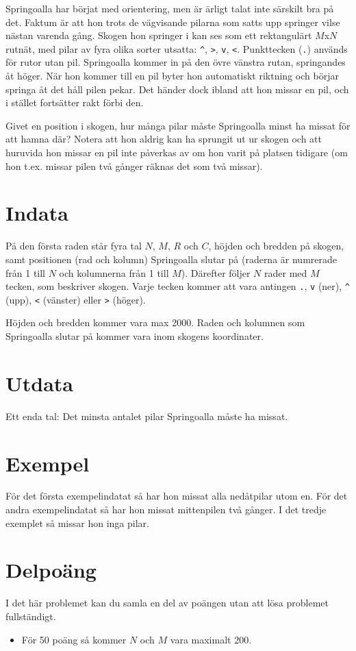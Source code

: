 
Springoalla har börjat med orientering, men är ärligt talat inte
särskilt bra på det. Faktum är att hon trots de vägvisande pilarna
som satts upp springer vilse nästan varenda gång. Skogen hon springer
i kan ses som ett rektangulärt $M$x$N$ rutnät, med pilar av fyra
olika sorter utsatta: \texttt{\^}, \texttt{>}, \texttt{v}, \texttt{<}.
Punkttecken (\texttt{.}) används för rutor utan pil. Springoalla
kommer in på den övre vänstra rutan, springandes åt höger. När hon
kommer till en pil byter hon automatiskt riktning och börjar springa
åt det håll pilen pekar. Det händer dock ibland att hon missar en
pil, och i stället fortsätter rakt förbi den.

Givet en position i skogen, hur många pilar måste Springoalla minst ha
missat för att hamna där? Notera att hon aldrig kan ha sprungit ut ur
skogen och att huruvida hon missar en pil inte påverkas av om hon varit
på platsen tidigare (om hon t.ex. missar pilen två gånger räknas det
som två missar).

\section*{Indata}

På den första raden står fyra tal $N$, $M$, $R$ och $C$, höjden och
bredden på skogen, samt positionen (rad och kolumn) Springoalla slutar
på (raderna är numrerade från 1 till $N$ och kolumnerna från 1 till
$M$). Därefter följer $N$ rader med $M$ tecken, som beskriver skogen.
Varje tecken kommer att vara antingen \texttt{.}, \texttt{v} (ner),
\texttt{\^} (upp), \texttt{<} (vänster) eller \texttt{>} (höger).

Höjden och bredden kommer vara max 2000. Raden och kolumnen som
Springoalla slutar på kommer vara inom skogens koordinater.

\section*{Utdata}

Ett enda tal: Det minsta antalet pilar Springoalla måste ha missat.

\section*{Exempel}

För det första exempelindatat så har hon missat alla nedåtpilar utom
en. För det andra exempelindatat så har hon missat mittenpilen två
gånger. I det tredje exemplet så missar hon inga pilar.

\section*{Delpoäng}

I det här problemet kan du samla en del av poängen utan att
lösa problemet fullständigt.

\begin{itemize}
    \item För 50 poäng så kommer $N$ och $M$ vara maximalt 200.
\end{itemize}
